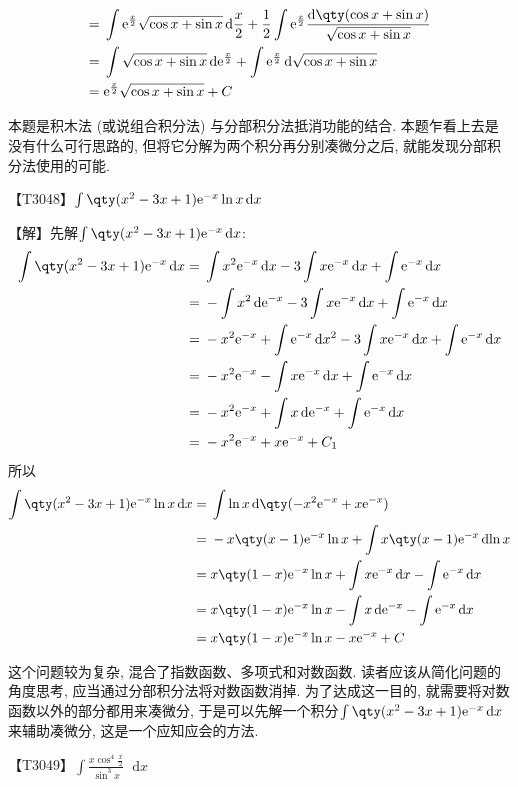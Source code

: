 \documentclass{ctexbook}
\newcommand{\e}{\mathrm{e}}
\newcommand*{\dif}{\mathop{}\!\mathrm{d}}
\begin{document}
{\begin{align*}
={}&\int\e^{\frac{x}{2}}\sqrt{\cos{x}+\sin{x}}\dif{\frac{x}{2}}+\frac{1}{2}\int\e^{\frac{x}{2}}\frac{\dif{\qty(\cos{x}+\sin{x})}}{\sqrt{\cos{x}+\sin{x}}}\\
={}&\int\sqrt{\cos{x}+\sin{x}}\dif{\e^{\frac{x}{2}}}+\int\e^{\frac{x}{2}}\dif{\sqrt{\cos{x}+\sin{x}}}\\
={}&\e^{\frac{x}{2}}\sqrt{\cos{x}+\sin{x}}+C
\end{align*}\par
{\kaishu 本题是积木法 (或说组合积分法) 与分部积分法抵消功能的结合. 本题乍看上去是没有什么可行思路的, 但将它分解为两个积分再分别凑微分之后, 就能发现分部积分法使用的可能. \par}
【T3048】$\int\qty(x^{2}-3x+1)\e^{-x}\ln{x}\dif{x}$\par
【解】先解$\int\qty(x^{2}-3x+1)\e^{-x}\dif{x}$: 
\begin{align*}
\int\qty(x^{2}-3x+1)\e^{-x}\dif{x}={}&\int x^{2}\e^{-x}\dif{x}-3\int x\e^{-x}\dif{x}+\int\e^{-x}\dif{x}\\
={}&-\int x^{2}\dif{\e^{-x}}-3\int x\e^{-x}\dif{x}+\int\e^{-x}\dif{x}\\
={}&-x^{2}\e^{-x}+\int\e^{-x}\dif{x^{2}}-3\int x\e^{-x}\dif{x}+\int\e^{-x}\dif{x}\\
={}&-x^{2}\e^{-x}-\int x\e^{-x}\dif{x}+\int\e^{-x}\dif{x}\\
={}&-x^{2}\e^{-x}+\int x\dif{\e^{-x}}+\int\e^{-x}\dif{x}\\
={}&-x^{2}\e^{-x}+x\e^{-x}+C_{1}
\end{align*}
所以
\begin{align*}
\int\qty(x^{2}-3x+1)\e^{-x}\ln{x}\dif{x}={}&\int\ln{x}\dif{\qty(-x^{2}\e^{-x}+x\e^{-x})}\\
={}&-x\qty(x-1)\e^{-x}\ln{x}+\int x\qty(x-1)\e^{-x}\dif{\ln{x}}\\
={}&x\qty(1-x)\e^{-x}\ln{x}+\int x\e^{-x}\dif{x}-\int\e^{-x}\dif{x}\\
={}&x\qty(1-x)\e^{-x}\ln{x}-\int x\dif{\e^{-x}}-\int\e^{-x}\dif{x}\\
={}&x\qty(1-x)\e^{-x}\ln{x}-x\e^{-x}+C
\end{align*}\par
{\kaishu 这个问题较为复杂, 混合了指数函数、多项式和对数函数. 读者应该从简化问题的角度思考, 应当通过分部积分法将对数函数消掉. 为了达成这一目的, 就需要将对数函数以外的部分都用来凑微分, 于是可以先解一个积分$\int\qty(x^{2}-3x+1)\e^{-x}\dif{x}$来辅助凑微分, 这是一个应知应会的方法. \par}
【T3049】$\int\frac{x\cos^{4}{\frac{x}{2}}}{\sin^{3}{x}}\dif{x}$\par
}
\end{document}

